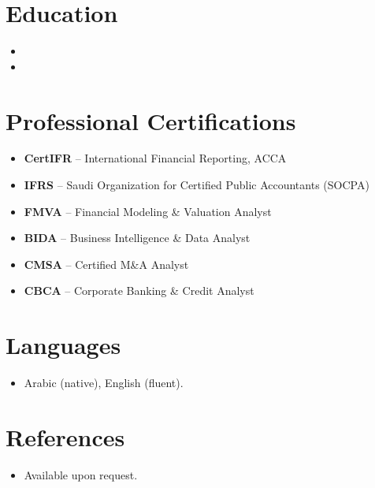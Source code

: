 \documentclass[11pt,a4paper,sans]{moderncv}
\begin{document}

\section{Education}
\vspace{1pt}
\begin{itemize}

\item{}

\vspace{3pt}

\item{}

\end{itemize}


\section{Professional Certifications}
\vspace{1pt}
\begin{itemize}
\item \textbf{CertIFR} -- International Financial Reporting, ACCA
\item \textbf{IFRS} -- Saudi Organization for Certified Public Accountants (SOCPA)
\item \textbf{FMVA} -- Financial Modeling \& Valuation Analyst
\item \textbf{BIDA} -- Business Intelligence \& Data Analyst
\item \textbf{CMSA} -- Certified M\&A Analyst
\item \textbf{CBCA} -- Corporate Banking \& Credit Analyst
\end{itemize}


\section{Languages}
\vspace{1pt}
\begin{itemize}
\item Arabic (native), English (fluent).
\end{itemize}


\section{References}
\vspace{1pt}
\begin{itemize}
\item{Available upon request.}
\end{itemize}
\end{document}
